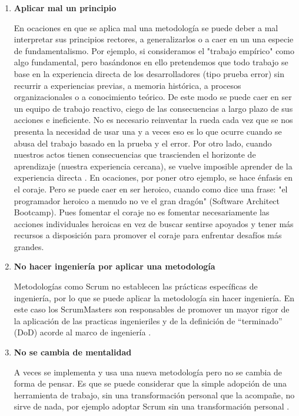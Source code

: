\begin{enumerate}
\item \textbf{Aplicar mal un principio}

En ocaciones en que se aplica mal una metodología se puede deber a mal interpretar sus principios rectores, a generalizarlos o a caer en un una especie de fundamentalismo. Por ejemplo, si consideramos el "trabajo empírico" como algo fundamental, pero basándonos en ello pretendemos que todo trabajo se base en la experiencia directa de los desarrolladores (tipo prueba error) sin recurrir a experiencias previas, a memoria histórica, a procesos organizacionales o a conocimiento teórico. De este modo se puede caer en ser un equipo de trabajo reactivo, ciego de las consecuencias a largo plazo de sus acciones e ineficiente. No es necesario reinventar la rueda cada vez que se nos presenta la necesidad de usar una y a veces eso es lo que ocurre cuando se abusa del trabajo basado en la prueba y el error. Por otro lado, cuando nuestros actos tienen consecuencias que trascienden el horizonte de aprendizaje (nuestra experiencia cercana), se vuelve imposible aprender de la experiencia directa \cite{Peter-Senge-1990}. 
En ocaciones, por poner otro ejemplo, se hace énfasis en el coraje. Pero se puede caer en ser heroico, cuando como dice una frase: "el programador heroico a menudo no ve el gran dragón" (Software Architect Bootcamp). Pues fomentar el coraje no es fomentar necesariamente las acciones individuales heroicas en vez de buscar sentirse apoyados y tener más recursos a disposición para promover el coraje para enfrentar desafíos más grandes.

\item \textbf{No hacer ingeniería por aplicar una metodología}

Metodologías como Scrum  no establecen las prácticas específicas de ingeniería, por lo que se puede aplicar la metodología sin hacer ingeniería. En este caso los ScrumMasters son responsables de promover un mayor rigor de la aplicación de las practicas ingenieriles y de la definición de “terminado” (DoD) acorde al marco de ingeniería \cite{Gantthead-James-2010}.

\item \textbf{No se cambia de mentalidad}

A veces se implementa y usa una nueva metodología pero no se cambia de forma de pensar. Es que se puede considerar que la simple adopción de una herramienta de trabajo, sin una transformación personal que la acompañe, no sirve de nada, por ejemplo adoptar Scrum sin una transformación personal \cite{Martin-Alaimo-Kleer-2014}. 


\end{enumerate}
